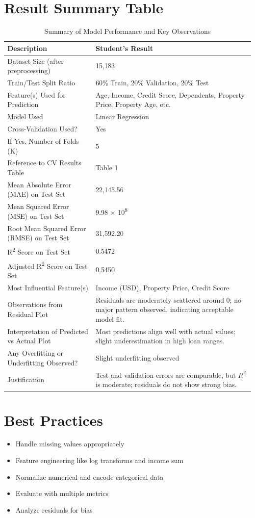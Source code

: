 \documentclass[12pt]{article}
\begin{document}
\section*{Result Summary Table}
\begin{table}[H]
\centering
\begin{tabular}{@{}p{6.5cm}p{7.5cm}@{}}
\toprule
\textbf{Description} & \textbf{Student’s Result} \\
\midrule
Dataset Size (after preprocessing) & 15,183 \\
Train/Test Split Ratio & 60\% Train, 20\% Validation, 20\% Test \\
Feature(s) Used for Prediction & Age, Income, Credit Score, Dependents, Property Price, Property Age, etc. \\
Model Used & Linear Regression \\
Cross-Validation Used? & Yes \\
If Yes, Number of Folds (K) & 5 \\
Reference to CV Results Table & Table 1 \\
Mean Absolute Error (MAE) on Test Set & 22,145.56 \\
Mean Squared Error (MSE) on Test Set & 9.98 × 10\textsuperscript{8} \\
Root Mean Squared Error (RMSE) on Test Set & 31,592.20 \\
R\textsuperscript{2} Score on Test Set & 0.5472 \\
Adjusted R\textsuperscript{2} Score on Test Set & 0.5450 \\
Most Influential Feature(s) & Income (USD), Property Price, Credit Score \\
Observations from Residual Plot & Residuals are moderately scattered around 0; no major pattern observed, indicating acceptable model fit. \\
Interpretation of Predicted vs Actual Plot & Most predictions align well with actual values; slight underestimation in high loan ranges. \\
Any Overfitting or Underfitting Observed? & Slight underfitting observed \\
Justification & Test and validation errors are comparable, but $R^2$ is moderate; residuals do not show strong bias. \\
\bottomrule
\end{tabular}
\caption{Summary of Model Performance and Key Observations}
\end{table}


\section*{Best Practices}
\begin{itemize}
  \item Handle missing values appropriately
  \item Feature engineering like log transforms and income sum
  \item Normalize numerical and encode categorical data
  \item Evaluate with multiple metrics
  \item Analyze residuals for bias
\end{itemize}
\end{document}
